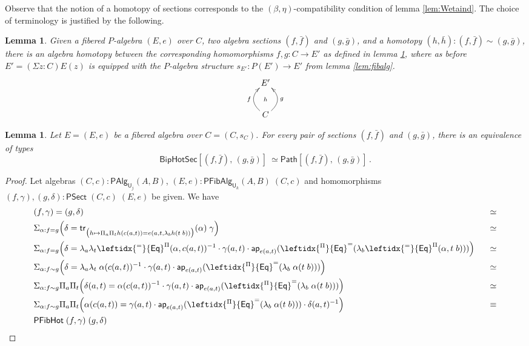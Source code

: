 \documentclass[10pt,a4paper,oneside,reqno]{amsart}
\numberwithin{equation}{section}
\theoremstyle{mythm}
\newtheorem{lemma}[theorem]{Lemma}
\theoremstyle{mydef}
\theoremstyle{myrmk}
\newcommand{\ct}{\cdot}
\newcommand{\trans}{\mathsf{tr}}
\newcommand{\funext}{\leftidx{^\Pi}{\mathsf{Eq}}^{=}}
\newcommand{\happly}{\leftidx{^=}{\mathsf{Eq}}^{\Pi}}
\newcommand{\prd}[1]{\Pi_{#1}}
\newcommand{\sm}[1]{\Sigma_{#1}}
\newcommand{\lam}[1]{\lambda_{#1}}
\newcommand{\app}{\mathsf{ap}}
\newcommand{\Id}{\mathsf{Path}}
\newcommand{\UU}{\mathsf{U}}
\newcommand{\HoSec}{\mathsf{BipHotSec}}
\newcommand{\WFibCell}{\mathsf{PFibHot}}
\newcommand{\WAlg}{\mathsf{PAlg}}
\newcommand{\WFibAlg}{\mathsf{PFibAlg}}
\newcommand{\WFibHom}{\mathsf{PSect}}
\begin{document}
Observe that the notion of a homotopy of sections corresponds to the $(\beta, \eta)$-compatibility condition of lemma \ref{lem:Wetaind}.  The choice of terminology is justified by the following.

\begin{lemma}\label{lem:fibalghom}
Given a fibered $P$-algebra $(E, e)$ over $C$, two algebra sections $(f, \bar{f})$ and $(g, \bar{g})$, and a homotopy $(h, \bar{h}) : (f, \bar{f}) \sim (g, \bar{g})$, there is an algebra  homotopy between the corresponding homomorphisms $f, g : C\to E'$ as defined in lemma \ref{lem:fibalghom}, where as before $E' = (\Sigma z : C) E(z)$ is equipped with the $P$-algebra structure $s_{E'} :P(E')\to E'$ from lemma \ref{lem:fibalg}.
\[
\xymatrix{
 E' \ar@{}[d]|{h} \\ 
C \ar@/^1.2pc/[u]^{f}  \ar@/_1.2pc/[u]_{g}
}
 \]
\end{lemma}




\begin{lemma}\label{lem:fibhomeqid} Let $E = (E, e)$ be a fibered algebra over $C = (C, s_C)$. 
For every pair of sections $(f, \bar{f})$ and $(g, \bar{g})$, 
there is an equivalence of types
\[
\HoSec[ (f, \bar{f}) ,\, (g, \bar{g}) ]\
\simeq 
\Id[ (f, \bar{f}) ,\, (g, \bar{g}) ] \, .
\]
\end{lemma}

\begin{proof}
Let algebras $(C,c) : \WAlg_{\UU_j}(A,B)$, $(E,e) : \WFibAlg_{\UU_k}(A,B) \; (C,c)$ and homomorphisms $(f,\gamma), (g,\delta) : \WFibHom \; (C,c) \; (E,e)$ be given. We have
\begin{alignat*}{4}
& (f,\gamma) = (g,\delta) & \simeq \\
& \sm{\alpha : f = g} \Big(\delta = \trans_{\big(h \mapsto \prd{a}\prd{t} h(c(a,t)) = e(a,t,\lam{b} h(t\;b))\big)}(\alpha) \; \gamma\Big) & \simeq \\
& \sm{\alpha : f = g} \Big(\delta = \lam{a} \lam{t} \happly(\alpha,c(a,t))^{-1} \ct \gamma(a,t) \ct \app_{e(a,t)}(\funext (\lam{b}\happly(\alpha,t \; b))) \Big) & \;\;\; \simeq \\
& \sm{\alpha : f \sim g} \Big(\delta = \lam{a} \lam{t} \; \alpha(c(a,t))^{-1} \ct \gamma(a,t) \ct \app_{e(a,t)}(\funext (\lam{b}\; \alpha(t \; b))) \Big) & \simeq \\
& \sm{\alpha : f \sim g} \prd{a}\prd{t}\Big(\delta(a,t) = \alpha(c(a,t))^{-1} \ct \gamma(a,t) \ct \app_{e(a,t)}(\funext (\lam{b}\; \alpha(t \; b))) \Big) & \simeq \\ 
& \sm{\alpha : f \sim g} \prd{a}\prd{t}\Big(\alpha(c(a,t)) = \gamma(a,t) \ct \app_{e(a,t)}(\funext (\lam{b}\; \alpha(t \; b))) \ct \delta(a,t)^{-1} \Big) & \equiv \\ 
& \WFibCell \; (f,\gamma) \; (g,\delta)
\end{alignat*}
\end{proof}
\end{document}
